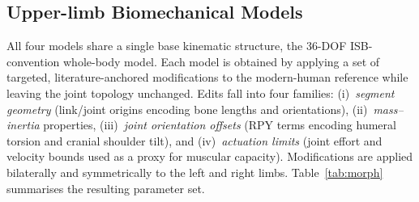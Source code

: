 
\subsection{Upper-limb Biomechanical Models}

  All four models share a single base kinematic structure, the 36-DOF
  ISB-convention whole-body model. Each model is obtained by applying a set of
  targeted, literature-anchored modifications to the modern-human reference while leaving the joint topology unchanged. Edits fall
  into four families: (i)~\emph{segment geometry} (link/joint origins encoding
  bone lengths and orientations), (ii)~\emph{mass--inertia} properties,
  (iii)~\emph{joint orientation offsets} (RPY terms encoding humeral torsion and
  cranial shoulder tilt), and (iv)~\emph{actuation limits} (joint effort and
  velocity bounds used as a proxy for muscular capacity). Modifications are
  applied bilaterally and symmetrically to the left and right limbs.
  Table~\ref{tab:morph} summarises the resulting parameter set.




